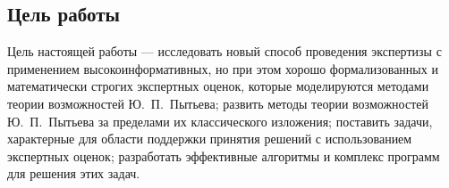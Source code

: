 \subsection{Цель работы}
Цель настоящей работы --- исследовать новый способ проведения экспертизы с применением высокоинформативных, но при этом хорошо формализованных и математически строгих экспертных оценок, которые моделируются методами теории возможностей Ю.~П.~Пытьева; развить методы теории возможностей Ю.~П.~Пытьева за пределами их классического изложения; поставить задачи, характерные для области поддержки принятия решений с использованием экспертных оценок; разработать эффективные алгоритмы и комплекс программ для решения этих задач. 


